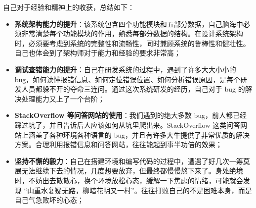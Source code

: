 \documentclass{ctexart}
\begin{document}
    自己对于经验和精神上的收获，总结如下：

    \begin{itemize}
        \item \textbf{系统架构能力的提升}：该系统包含四个功能模块和五部分数据，自己脑海中必须非常清楚每个功能模块的作用，熟悉每部分数据的结构。在设计系统架构时，必须要考虑到系统的完整性和流畅性，同时兼顾系统的鲁棒性和健壮性。自己也体会到了架构师对于能力和经验的要求非常高；
        \item \textbf{调试查错能力的提升}：自己在研发系统的过程中，遇到了许多大大小小的 bug，如何读懂报错信息、如何定位错误位置、如何分析错误原因，是每个研发人员都躲不开的夺命三连问。通过这次系统研发的经历，自己对于 bug 的解决处理能力又上了一个台阶；
        \item \textbf{StackOverflow 等问答网站的使用}：我们遇到的绝大多数 bug，前人都已经踩过坑了，并且告诉后人应该如何从坑里爬出来。StackOverflow 这类问答网站上涵盖了各种环境各种语言的 bug，并且有许多大牛提供了非常优质的解决方案。合理利用报错信息和问答网站，往往能起到事半功倍的效果；
        \item \textbf{坚持不懈的毅力}：自己在搭建环境和编写代码的过程中，遭遇了好几次一筹莫展无法继续下去的情况，几度想要放弃，但最终都慢慢熬下来了。身处绝境时，不妨出去散散心，换个环境放松心态，缓解一下焦虑的情绪，可能就会发现 “山重水复疑无路，柳暗花明又一村”。往往打败自己的不是困难本身，而是自己气急败坏的心态；
    \end{itemize}

    
    
\end{document}
